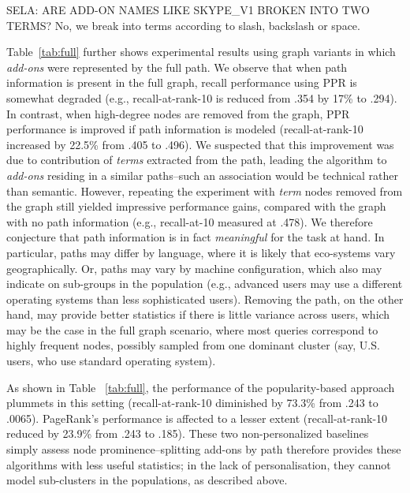 \documentclass[11pt,oneside]{book}
\begin{document}
SELA: ARE ADD-ON NAMES LIKE SKYPE\_V1 BROKEN INTO TWO TERMS? No, we break into terms according to slash, backslash or space.

Table~\ref{tab:full} further shows experimental results using graph variants in which {\it add-ons} were represented by the full path. We observe that when path information is present in the full graph, recall performance using PPR is somewhat degraded (e.g., recall-at-rank-10 is reduced from .354 by 17\% to .294). In contrast, when high-degree nodes are removed from the graph, PPR performance is improved if path information is modeled (recall-at-rank-10 increased by 22.5\% from .405 to .496). We suspected that this improvement was due to contribution of {\it terms} extracted from the path, leading the algorithm to {\it add-ons} residing in a similar paths--such an association would be technical rather than semantic. However, repeating the experiment with {\it term} nodes removed from the graph still yielded impressive performance gains, compared with the graph with no path information (e.g., recall-at-10 measured at .478). We therefore conjecture that path information is in fact {\it meaningful} for the task at hand. In particular, paths may differ by language, where it is likely that eco-systems vary geographically. Or, paths may vary by machine configuration, which also may indicate on sub-groups in the population (e.g., advanced users may use a different operating systems than less sophisticated users). Removing the path, on the other hand, may provide better statistics if there is little variance across users, which may be the case in the full graph scenario, where most queries correspond to highly frequent nodes, possibly sampled from one dominant cluster (say, U.S. users, who use standard operating system). 

As shown in Table ~\ref{tab:full}, the performance of the popularity-based approach plummets in this setting (recall-at-rank-10 diminished by 73.3\% from .243 to .0065). PageRank's performance is affected to a lesser extent (recall-at-rank-10 reduced by 23.9\% from .243 to .185). These two non-personalized baselines simply assess node prominence--splitting add-ons by path therefore provides these algorithms with less useful statistics; in the lack of personalisation, they cannot model sub-clusters in the populations, as described above.
\end{document}
